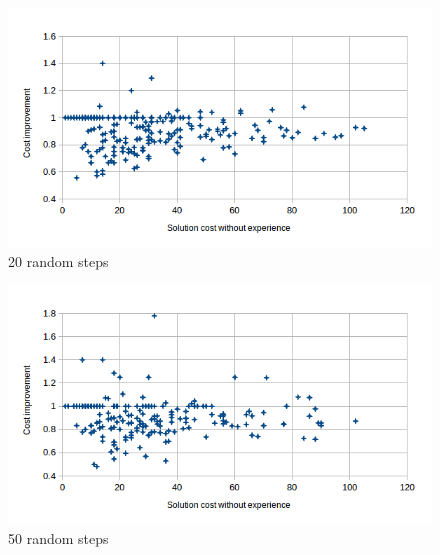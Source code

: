 \documentclass[letterpaper]{article}
\begin{document}
\begin{figure}
	\begin{center}
	\includegraphics[scale=0.5]{Cost_100_20.png}
	\end{center}
	\caption{20 random steps}
	 \label{fig:c_100_20}
\end{figure}

\begin{figure}
	\begin{center}
	\includegraphics[scale=0.5]{Cost_100_50.png}
	\end{center}
	\caption{50 random steps}
	 \label{fig:c_100_50}
\end{figure}
\end{document}
